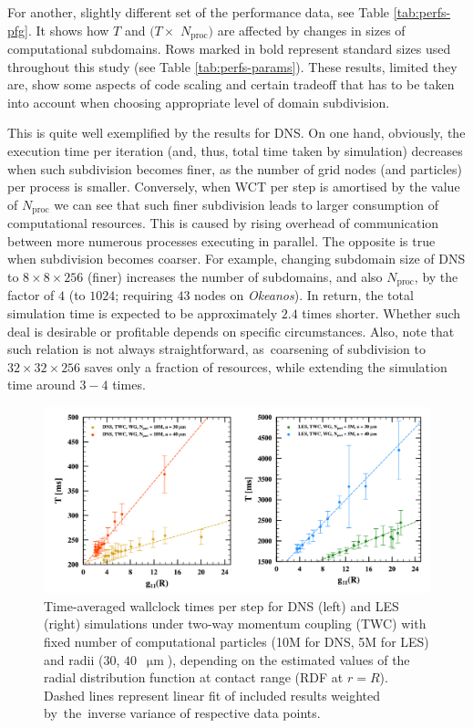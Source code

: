 \documentclass{pracamgren}
\begin{document}
For another, slightly different set of the performance data, see Table \ref{tab:perfs-pfg}.
It shows how $T$ and $(T \times$ $N_{\text{proc}})$ are affected by changes in sizes of computational subdomains.
Rows marked in bold represent standard sizes used throughout this study (see Table \ref{tab:perfs-params}).
These results, limited they are, show some aspects of code scaling and certain tradeoff that has to be taken into account when choosing appropriate level of domain subdivision.

This is quite well exemplified by the results for DNS.
On one hand, obviously, the execution time per iteration (and, thus, total time taken by simulation) decreases when such subdivision becomes finer, as the number of grid nodes (and particles) per process is smaller.
Conversely, when WCT per step is amortised by the value of $N_{\text{proc}}$ we can see that such finer subdivision leads to larger consumption of computational resources.
This is caused by rising overhead of communication between more numerous processes executing in parallel.
The opposite is true when subdivision becomes coarser.
For example, changing subdomain size of DNS to $8 \times 8 \times 256$ (finer) increases the number of subdomains, and also $N_{\text{proc}}$, by the factor of $4$ (to $1024$; requiring $43$ nodes on \emph{Okeanos}).
In return, the total simulation time is expected to be approximately $2.4$ times shorter.
Whether such deal is desirable or profitable depends on specific circumstances.
Also, note that such relation is not always straightforward, as~coarsening of subdivision to $32 \times 32 \times 256$ saves only a fraction of resources, while extending the simulation time around $3-4$ times.

\medskip

\begin{figure}[h]
\centering
\includegraphics[width=13.5cm]{img/plots/3-2c-pfsrdf.pdf}
\caption{
Time-averaged wallclock times per step for DNS (left) and LES (right) simulations under two-way momentum coupling (TWC) with fixed number of computational particles (10M for DNS, 5M for LES) and radii ($30$, $40$~$\upmu\text{m}$), depending on the estimated values of the radial distribution function at contact range (RDF at $r=R$).
Dashed lines represent linear fit of included results weighted by~the~inverse variance of respective data points.
}
\label{fig:pfsrdf}
\end{figure}
\end{document}
